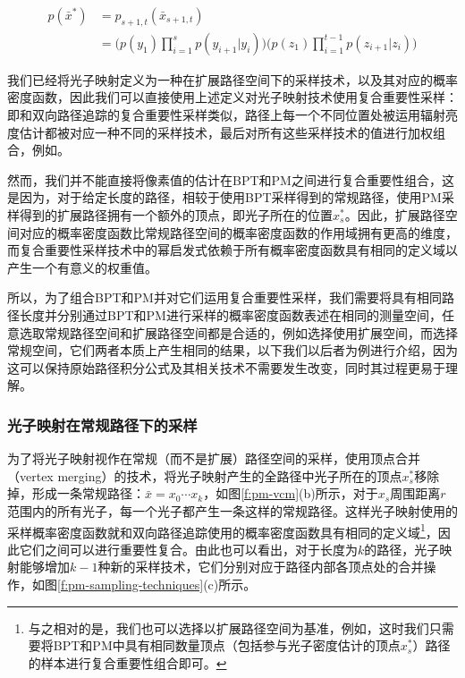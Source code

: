 \begin{equation}\label{e:pm-extended-path-pdf}
\begin{aligned}
	p(\bar{x}^{*})&=p_{s+1,t}(\bar{x}_{s+1,t})\\
	&=\Biggl(p(y_1)\prod^{s}_{i=1}p(y_{i+1}|y_i)\Biggl)\Biggl(p(z_1)\prod^{t-1}_{i=1}p(z_{i+1}|z_i)\Biggl)
\end{aligned}
\end{equation}

我们已经将光子映射定义为一种在扩展路径空间下的采样技术，以及其对应的概率密度函数，因此我们可以直接使用上述定义对光子映射技术使用复合重要性采样：即和双向路径追踪的复合重要性采样类似，路径上每一个不同位置处被运用辐射亮度估计都被对应一种不同的采样技术，最后对所有这些采样技术的值进行加权组合，例如\cite{a:BidirectionalPhotonMapping}。

然而，我们并不能直接将像素值的估计在BPT和PM之间进行复合重要性组合，这是因为，对于给定长度的路径，相较于使用BPT采样得到的常规路径，使用PM采样得到的扩展路径拥有一个额外的顶点，即光子所在的位置$x^{*}_s$。因此，扩展路径空间对应的概率密度函数比常规路径空间的概率密度函数的作用域拥有更高的维度，而复合重要性采样技术中的幂启发式依赖于所有概率密度函数具有相同的定义域以产生一个有意义的权重值。

所以，为了组合BPT和PM并对它们运用复合重要性采样，我们需要将具有相同路径长度并分别通过BPT和PM进行采样的概率密度函数表述在相同的测量空间，任意选取常规路径空间和扩展路径空间都是合适的，例如\cite{a:APathSpaceExtensionforRobustLightTransportSimulation}选择使用扩展空间，而\cite{a:LightTransportSimulationwithVertexConnectionandMerging}选择常规空间，它们两者本质上产生相同的结果，以下我们以后者为例进行介绍，因为这可以保持原始路径积分公式及其相关技术不需要发生改变，同时其过程更易于理解。





\subsubsection{光子映射在常规路径下的采样}
为了将光子映射视作在常规（而不是扩展）路径空间的采样，\cite{a:LightTransportSimulationwithVertexConnectionandMerging}使用顶点合并（vertex merging）的技术，将光子映射产生的全路径中光子所在的顶点$x^{*}_s$移除掉，形成一条常规路径：$\bar{x}=x_0\cdots x_k$，如图\ref{f:pm-vcm}(b)所示，对于$x_s$周围距离$r$范围内的所有光子，每一个光子都产生一条这样的常规路径。这样光子映射使用的采样概率密度函数就和双向路径追踪使用的概率密度函数具有相同的定义域\footnote{与之相对的是，我们也可以选择以扩展路径空间为基准，例如\cite{a:APathSpaceExtensionforRobustLightTransportSimulation}，这时我们只需要将BPT和PM中具有相同数量顶点（包括参与光子密度估计的顶点$x^{*}_s$）路径的样本进行复合重要性组合即可。}，因此它们之间可以进行重要性复合。由此也可以看出，对于长度为$k$的路径，光子映射能够增加$k-1$种新的采样技术，它们分别对应于路径内部各顶点处的合并操作，如图\ref{f:pm-sampling-techniques}(c)所示。

